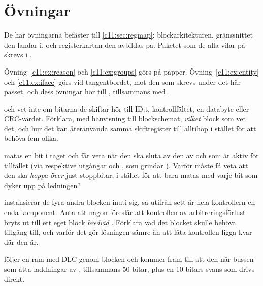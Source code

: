 
\section{Övningar}
\label{c11:sec:exercises}

\begin{aside}
De här övningarna befäster  till \ref{c11:sec:regmap}: blockarkitekturen,
gränssnittet den landar i, och registerkartan den avbildas på. Paketet  som de alla
vilar på skrevs i .

Övning~\ref{c11:ex:reason} och \ref{c11:ex:groups} görs på papper. Övning~\ref{c11:ex:entity} och
\ref{c11:ex:iface} görs vid tangentbordet, mot den  som skrevs
under det här passet.  och dess övningar hör till , tillsammans med
.
\end{aside}


\label{c11:ex:reason}
  och  vet inte om bitarna de skiftar hör till ID:t,
kontrollfältet, en databyte eller CRC-värdet. Förklara, med hänvisning till blockschemat,
\emph{vilket} block som vet det, och hur det kan återanvända samma skiftregister till alltihop i
stället för att behöva fem olika.

  matas en bit i taget och får veta när den ska sluta av den av
 och  som är aktiv för tillfället (via respektive utgångar
 och , som grindar ). Varför måste 
få veta att den ska \emph{hoppa över} just stoppbitar, i stället för att bara matas med varje bit som
dyker upp på ledningen?

  instansierar de fyra andra blocken inuti sig, så utifrån sett är hela
kontrollern en enda komponent. Anta att någon föreslår att kontrollen av arbitreringsförlust bryts ut
till ett eget block \emph{bredvid} . Förklara vad det blocket skulle behöva
tillgång till, och varför det gör lösningen sämre än att låta kontrollen ligga kvar där den är.

\label{c11:ex:groups}
 följer en ram med DLC  genom blocken och kommer fram till att den når
bussen som åtta laddningar av , tillsammans 50 bitar, plus en 10-bitars svans som
drivs direkt.

